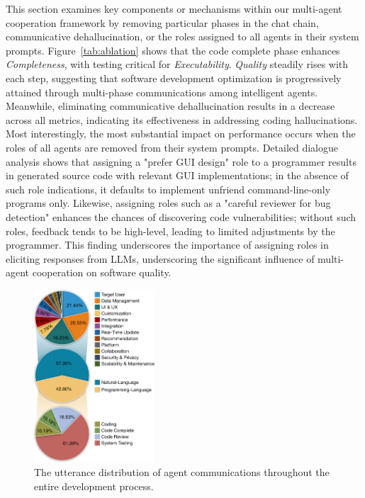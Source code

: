 \documentclass[11pt]{article}
\begin{document}
This section examines key components or mechanisms within our multi-agent cooperation framework by removing particular phases in the chat chain, communicative dehallucination, or the roles assigned to all agents in their system prompts.
Figure~\ref{tab:ablation} shows that the code complete phase enhances \textit{Completeness}, with testing critical for \textit{Executability}. 
\textit{Quality} steadily rises with each step, suggesting that software development optimization is progressively attained through multi-phase communications among intelligent agents.
Meanwhile, eliminating communicative dehallucination results in a decrease across all metrics, indicating its effectiveness in addressing coding hallucinations.
Most interestingly, the most substantial impact on performance occurs when the roles of all agents are removed from their system prompts.
Detailed dialogue analysis shows that assigning a "prefer GUI design" role to a programmer results in generated source code with relevant GUI implementations; in the absence of such role indications, it defaults to implement unfriend command-line-only programs only.
Likewise, assigning roles such as a "careful reviewer for bug detection" enhances the chances of discovering code vulnerabilities; without such roles, feedback tends to be high-level, leading to limited adjustments by the programmer.
This finding underscores the importance of assigning roles in eliciting responses from LLMs, underscoring the significant influence of multi-agent cooperation on software quality.

\begin{figure}[t]
    \centering
    \includegraphics[width=0.40\textwidth]{figs/utterance_distribution.pdf}
    \caption{The utterance distribution of agent communications throughout the entire development process.}
    \label{fig:utterance_distribution}
\end{figure}
\end{document}
